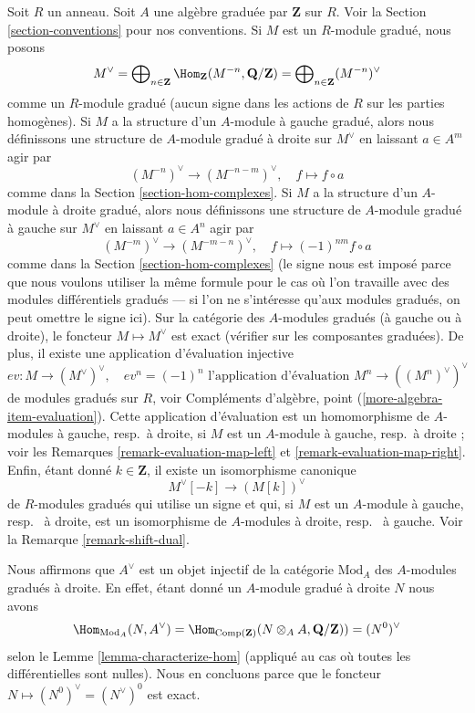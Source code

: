 \medskip\noindent
Soit $R$ un anneau. Soit $A$ une algèbre graduée par $\mathbf{Z}$ sur $R$. Voir la
Section \ref{section-conventions} pour nos conventions. Si $M$ est un $R$-module
gradué, nous posons
$$
M^\vee =
\bigoplus\nolimits_{n \in \mathbf{Z}}
\Hom_\mathbf{Z}(M^{-n}, \mathbf{Q}/\mathbf{Z}) =
\bigoplus\nolimits_{n \in \mathbf{Z}} (M^{-n})^\vee
$$
comme un $R$-module gradué (aucun signe dans les actions de $R$ sur les parties
homogènes). Si $M$ a la structure d'un $A$-module à gauche gradué, alors nous
définissons une structure de $A$-module gradué à droite sur $M^\vee$ en laissant
$a \in A^m$ agir par
$$
(M^{-n})^\vee \to (M^{-n - m})^\vee, \quad
f \mapsto f \circ a
$$
comme dans la Section \ref{section-hom-complexes}. Si $M$ a la structure d'un
$A$-module à droite gradué, alors nous définissons une structure de $A$-module
gradué à gauche sur $M^\vee$ en laissant $a \in A^n$ agir par
$$
(M^{-m})^\vee \to (M^{-m - n})^\vee, \quad
f \mapsto (-1)^{nm}f \circ a
$$
comme dans la Section \ref{section-hom-complexes} (le signe nous est imposé parce
que nous voulons utiliser la même formule pour le cas où l'on travaille avec des
modules différentiels gradués --- si l'on ne s'intéresse qu'aux modules
gradués, on peut omettre le signe ici). Sur la catégorie des $A$-modules
gradués (à gauche ou à droite), le foncteur $M \mapsto M^\vee$ est exact (vérifier
sur les composantes graduées). De plus, il existe une application d'évaluation
injective
$$
ev : M \longrightarrow (M^\vee)^\vee, \quad
ev^n = (-1)^n \text{ l'application d'évaluation }M^n \to ((M^n)^\vee)^\vee
$$
de modules gradués sur $R$, voir Compléments d'algèbre, point
(\ref{more-algebra-item-evaluation}). Cette application d'évaluation est un
homomorphisme de $A$-modules à gauche, resp.\ à droite, si $M$ est un
$A$-module à gauche, resp.\ à droite ; voir les Remarques
\ref{remark-evaluation-map-left} et \ref{remark-evaluation-map-right}. Enfin,
étant donné $k \in \mathbf{Z}$, il existe un isomorphisme canonique
$$
M^\vee[-k] \longrightarrow (M[k])^\vee
$$
de $R$-modules gradués qui utilise un signe et qui, si $M$ est un $A$-module à
gauche, resp. \ à droite, est un isomorphisme de $A$-modules à droite, resp. \ à
gauche. Voir la Remarque \ref{remark-shift-dual}.

\medskip\noindent
Nous affirmons que $A^\vee$ est un objet injectif de la catégorie $\text{Mod}_A$
des $A$-modules gradués à droite. En effet, étant donné un $A$-module gradué à
droite $N$ nous avons
$$
\Hom_{\text{Mod}_A}(N, A^\vee) =
\Hom_{\text{Comp}(\mathbf{Z})}(N \otimes_A A, \mathbf{Q}/\mathbf{Z})) =
(N^0)^\vee
$$
selon le Lemme \ref{lemma-characterize-hom} (appliqué au cas où toutes les
différentielles sont nulles). Nous en concluons parce que le foncteur $N \mapsto
(N^0)^\vee = (N^\vee)^0$ est exact.

